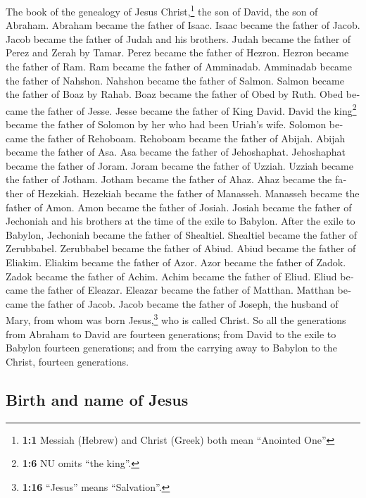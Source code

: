 \begin{paracol}{2}
\begin{otherlanguage}{english}
 The book of the genealogy of Jesus Christ,\footnote{\textbf{1:1}
  Messiah (Hebrew) and Christ (Greek) both mean ``Anointed One''} the
son of David, the son of Abraham.  Abraham became the
father of Isaac. Isaac became the father of Jacob. Jacob became the
father of Judah and his brothers.  Judah became the father
of Perez and Zerah by Tamar. Perez became the father of Hezron. Hezron
became the father of Ram.  Ram became the father of
Amminadab. Amminadab became the father of Nahshon. Nahshon became the
father of Salmon.  Salmon became the father of Boaz by
Rahab. Boaz became the father of Obed by Ruth. Obed became the father of
Jesse.  Jesse became the father of King David. David the
king\footnote{\textbf{1:6} NU omits ``the king''.} became the father of
Solomon by her who had been Uriah's wife.  Solomon became
the father of Rehoboam. Rehoboam became the father of Abijah. Abijah
became the father of Asa.  Asa became the father of
Jehoshaphat. Jehoshaphat became the father of Joram. Joram became the
father of Uzziah.  Uzziah became the father of Jotham.
Jotham became the father of Ahaz. Ahaz became the father of Hezekiah.
 Hezekiah became the father of Manasseh. Manasseh became
the father of Amon. Amon became the father of Josiah. 
Josiah became the father of Jechoniah and his brothers at the time of
the exile to Babylon.  After the exile to Babylon,
Jechoniah became the father of Shealtiel. Shealtiel became the father of
Zerubbabel.  Zerubbabel became the father of Abiud. Abiud
became the father of Eliakim. Eliakim became the father of Azor.
 Azor became the father of Zadok. Zadok became the father
of Achim. Achim became the father of Eliud.  Eliud became
the father of Eleazar. Eleazar became the father of Matthan. Matthan
became the father of Jacob.  Jacob became the father of
Joseph, the husband of Mary, from whom was born Jesus,\footnote{\textbf{1:16}
  ``Jesus'' means ``Salvation''.} who is called Christ. 
So all the generations from Abraham to David are fourteen generations;
from David to the exile to Babylon fourteen generations; and from the
carrying away to Babylon to the Christ, fourteen generations.

\hypertarget{birth-and-name-of-jesus}{%
\subsection{Birth and name of Jesus}\label{birth-and-name-of-jesus}}


\end{otherlanguage}
\end{paracol}
